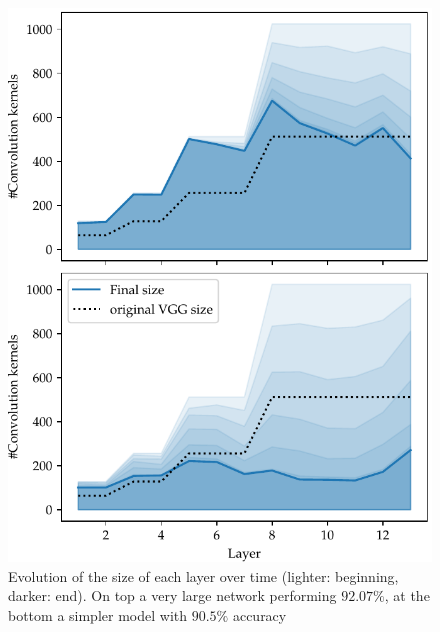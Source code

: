\begin{figure}
\begin{center}
\includegraphics[width=\columnwidth]{size_evolution}
\vspace*{-5mm} \caption{\label{network_size_evolution} Evolution of the size of
  each layer over time (lighter: beginning, darker: end). On top a very large
  network performing $92.07\%$, at the bottom a simpler model with $90.5\%$
  accuracy
} \end{center}
\vspace*{-4mm}
\end{figure}

